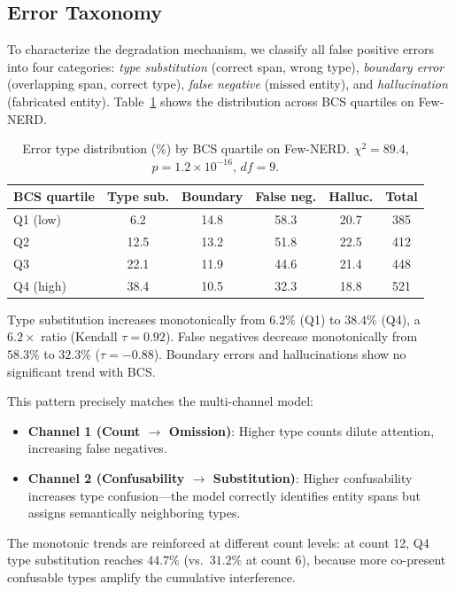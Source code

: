 \documentclass[11pt,a4paper]{article}
\begin{document}
\subsection{Error Taxonomy}
\label{sec:taxonomy}

To characterize the degradation mechanism, we classify all false positive errors into four categories: \emph{type substitution} (correct span, wrong type), \emph{boundary error} (overlapping span, correct type), \emph{false negative} (missed entity), and \emph{hallucination} (fabricated entity).
Table~\ref{tab:error-taxonomy} shows the distribution across BCS quartiles on Few-NERD.

\begin{table}[t]
\centering
\small
\caption{Error type distribution (\%) by BCS quartile on Few-NERD. $\chi^2{=}89.4$, $p{=}1.2{\times}10^{-16}$, $df{=}9$.}
\label{tab:error-taxonomy}
\begin{tabular}{lcccc|c}
\toprule
BCS quartile & Type sub. & Boundary & False neg. & Halluc. & Total \\
\midrule
Q1 (low)  &  6.2 & 14.8 & 58.3 & 20.7 & 385 \\
Q2        & 12.5 & 13.2 & 51.8 & 22.5 & 412 \\
Q3        & 22.1 & 11.9 & 44.6 & 21.4 & 448 \\
Q4 (high) & 38.4 & 10.5 & 32.3 & 18.8 & 521 \\
\bottomrule
\end{tabular}
\end{table}

Type substitution increases monotonically from $6.2\%$ (Q1) to $38.4\%$ (Q4), a $6.2\times$ ratio (Kendall $\tau{=}0.92$).
False negatives decrease monotonically from $58.3\%$ to $32.3\%$ ($\tau{=}{-}0.88$).
Boundary errors and hallucinations show no significant trend with BCS.

This pattern precisely matches the multi-channel model:
\begin{itemize}
\item \textbf{Channel 1 (Count $\to$ Omission)}: Higher type counts dilute attention, increasing false negatives.
\item \textbf{Channel 2 (Confusability $\to$ Substitution)}: Higher confusability increases type confusion---the model correctly identifies entity spans but assigns semantically neighboring types.
\end{itemize}

The monotonic trends are reinforced at different count levels: at count 12, Q4 type substitution reaches $44.7\%$ (vs.\ $31.2\%$ at count 6), because more co-present confusable types amplify the cumulative interference.
\end{document}
